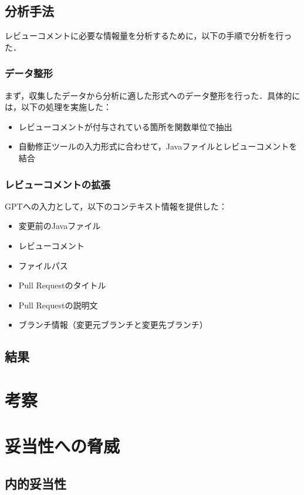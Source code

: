 \documentclass[11pt]{jreport}
\begin{document}
\section{分析手法}
レビューコメントに必要な情報量を分析するために，以下の手順で分析を行った．

\subsection{データ整形}
まず，収集したデータから分析に適した形式へのデータ整形を行った．具体的には，以下の処理を実施した：

\begin{itemize}
    \item レビューコメントが付与されている箇所を関数単位で抽出
    \item 自動修正ツールの入力形式に合わせて，Javaファイルとレビューコメントを結合
\end{itemize}
\fi
\subsection{レビューコメントの拡張}
GPTへの入力として，以下のコンテキスト情報を提供した：
\begin{itemize}
    \item 変更前のJavaファイル
    \item レビューコメント
    \item ファイルパス
    \item Pull Requestのタイトル
    \item Pull Requestの説明文
    \item ブランチ情報（変更元ブランチと変更先ブランチ）
\end{itemize}


\section {結果}

\chapter{考察}\label{chap:fig-tab-exp}


\chapter{妥当性への脅威}\label{chap:fig-tab-exp}

\section{内的妥当性}
\end{document}
